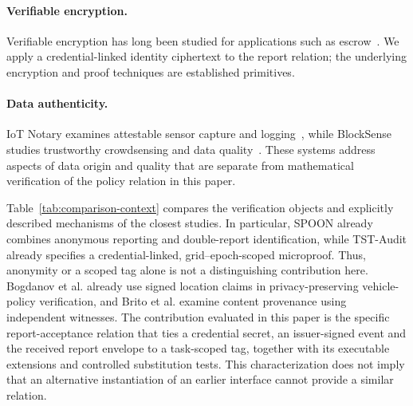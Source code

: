 \documentclass[pdflatex,iicol,sn-mathphys-num]{sn-jnl}
\begin{document}
\paragraph{Verifiable encryption.} Verifiable encryption has long been studied for applications such as escrow~\citep{CamenischShoup2003}. We apply a credential-linked identity ciphertext to the report relation; the underlying encryption and proof techniques are established primitives.

\paragraph{Data authenticity.} IoT Notary examines attestable sensor capture and logging~\citep{Panwar2022IoTNotary}, while BlockSense studies trustworthy crowdsensing and data quality~\citep{Huang2024BlockSense}. These systems address aspects of data origin and quality that are separate from mathematical verification of the policy relation in this paper.

Table~\ref{tab:comparison-context} compares the verification objects and explicitly described mechanisms of the closest studies. In particular, SPOON already combines anonymous reporting and double-report identification, while TST-Audit already specifies a credential-linked, grid--epoch-scoped microproof. Thus, anonymity or a scoped tag alone is not a distinguishing contribution here. Bogdanov et al. already use signed location claims in privacy-preserving vehicle-policy verification, and Brito et al. examine content provenance using independent witnesses. The contribution evaluated in this paper is the specific report-acceptance relation that ties a credential secret, an issuer-signed event and the received report envelope to a task-scoped tag, together with its executable extensions and controlled substitution tests. This characterization does not imply that an alternative instantiation of an earlier interface cannot provide a similar relation.
\end{document}
